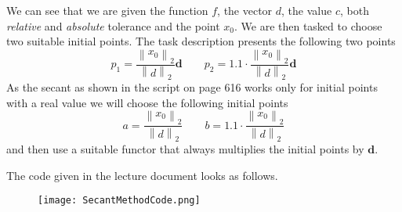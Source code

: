 \documentclass{article}
\begin{document}
We can see that we are given the function $f$, the vector $d$, the value $c$, both \textit{relative} and \textit{absolute} tolerance and the point $x_{0}$. We are then tasked to choose two suitable initial points. The task description presents the following two points
\begin{equation*}
    p_{1} = \frac{\left\lVert x_{0}\right\rVert_{2}}{\left\lVert d\right\rVert_{2}}\mathbf{d}  \qquad p_{2} = 1.1 \cdot \frac{\left\lVert x_{0}\right\rVert_{2}}{\left\lVert d\right\rVert_{2}}\mathbf{d}
\end{equation*}
As the secant as shown in the script on page 616 works only for initial points with a real value we will choose the following initial points
\begin{equation*}
    a = \frac{\left\lVert x_{0}\right\rVert_{2}}{\left\lVert d\right\rVert_{2}}  \qquad b = 1.1 \cdot \frac{\left\lVert x_{0}\right\rVert_{2}}{\left\lVert d\right\rVert_{2}}
\end{equation*}
and then use a suitable functor that always multiplies the initial points by $\mathbf{d}$.

\pagebreak

\noindent The code given in the lecture document looks as follows.

\begin{figure}[!hbt]
    \centering
\texttt{[image: SecantMethodCode.png]}
\end{figure}
\end{document}
